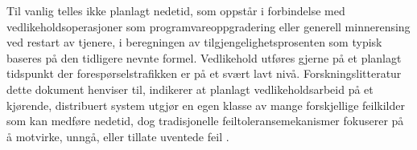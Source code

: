 Til vanlig telles ikke planlagt nedetid, som oppstår i forbindelse med vedlikeholdsoperasjoner som programvareoppgradering eller generell minnerensing ved restart av tjenere, i beregningen av tilgjengelighetsprosenten som typisk baseres på den tidligere nevnte formel. Vedlikehold utføres gjerne på et planlagt tidspunkt der forespørselstrafikken er på et svært lavt nivå. Forskningslitteratur dette dokument henviser til, indikerer at planlagt vedlikeholdsarbeid på et kjørende, distribuert system utgjør en egen klasse av mange forskjellige feilkilder som kan medføre nedetid, dog tradisjonelle feiltoleransemekanismer fokuserer på å motvirke, unngå, eller tillate uventede feil \citep{dumitracs2009upgrades}.


